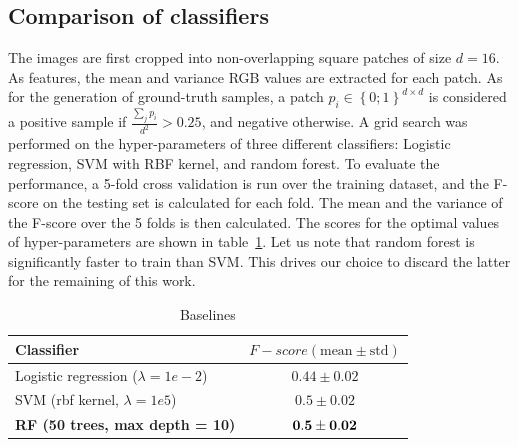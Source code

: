 \documentclass[10pt,conference,compsocconf]{IEEEtran}
\begin{document}
\subsection{Comparison of classifiers}
\label{baseline_selection}
The images are first cropped into non-overlapping square patches of size $d = 16$. As features,
the mean and variance RGB values are extracted for each patch. As for the generation of ground-truth samples, a patch $p_i \in \left\{0;1\right\}^{d \times d}$ is considered a positive sample if $\frac{\sum_{j}{p_i}}{d^2} > 0.25$, and negative otherwise. A grid search was performed on the hyper-parameters of three different classifiers: Logistic regression, SVM with RBF kernel, and random forest. To evaluate the performance, a 5-fold cross validation is run over the training dataset, and the F-score on the testing set is calculated for each fold. The mean and the variance of the F-score over the 5 folds is then calculated. The scores for the optimal values of hyper-parameters are shown in table~\ref{table:baselines}. Let us note that random forest is significantly faster to train than SVM. This drives our choice to discard the latter for the remaining of this work.
		\begin{table}[h]
		\centering
		\begin{tabular}{p{} c}		
			\textbf{Classifier} &  \textbf{$F-score (\text{mean}\pm \text{std})$}\\
			\hline \hline
			Logistic regression ($\lambda = 1e-2$) & $0.44 \pm 0.02$ \\ \hline
			SVM (rbf kernel, $\lambda = 1e5$) & $0.5 \pm 0.02$ \\ \hline
			\textbf{RF (50 trees, max depth = 10)} & $\bf{0.5 \pm 0.02}$ \\
			\hline
		\end{tabular}
		\label{table:baselines}
		\caption{Baselines}
		\end{table}
\end{document}
